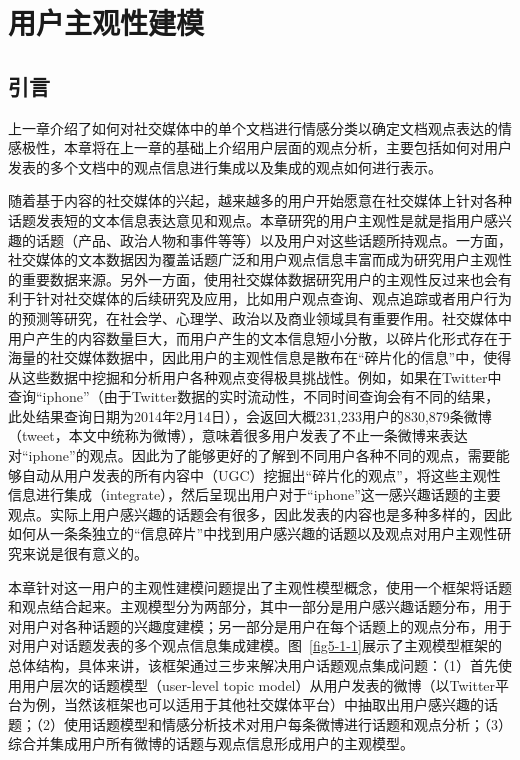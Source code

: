 \chapter{用户主观性建模}
\label{ch5}

\section{引言}
上一章介绍了如何对社交媒体中的单个文档进行情感分类以确定文档观点表达的情感极性，本章将在上一章的基础上介绍用户层面的观点分析，主要包括如何对用户发表的多个文档中的观点信息进行集成以及集成的观点如何进行表示。

随着基于内容的社交媒体的兴起，越来越多的用户开始愿意在社交媒体上针对各种话题发表短的文本信息表达意见和观点。本章研究的用户主观性是就是指用户感兴趣的话题（产品、政治人物和事件等等）以及用户对这些话题所持观点。一方面，社交媒体的文本数据因为覆盖话题广泛和用户观点信息丰富而成为研究用户主观性的重要数据来源。另外一方面，使用社交媒体数据研究用户的主观性反过来也会有利于针对社交媒体的后续研究及应用，比如用户观点查询、观点追踪或者用户行为的预测等研究，在社会学、心理学、政治以及商业领域具有重要作用。社交媒体中用户产生的内容数量巨大，而用户产生的文本信息短小分散，以碎片化形式存在于海量的社交媒体数据中，因此用户的主观性信息是散布在“碎片化的信息”中，使得从这些数据中挖掘和分析用户各种观点变得极具挑战性。例如，如果在Twitter中查询“iphone”（由于Twitter数据的实时流动性，不同时间查询会有不同的结果，此处结果查询日期为2014年2月14日），会返回大概231,233用户的830,879条微博（tweet，本文中统称为微博），意味着很多用户发表了不止一条微博来表达对“iphone”的观点。因此为了能够更好的了解到不同用户各种不同的观点，需要能够自动从用户发表的所有内容中（UGC）挖掘出“碎片化的观点”，将这些主观性信息进行集成（integrate），然后呈现出用户对于“iphone”这一感兴趣话题的主要观点。实际上用户感兴趣的话题会有很多，因此发表的内容也是多种多样的，因此如何从一条条独立的“信息碎片”中找到用户感兴趣的话题以及观点对用户主观性研究来说是很有意义的。

本章针对这一用户的主观性建模问题提出了主观性模型概念，使用一个框架将话题和观点结合起来。主观模型分为两部分，其中一部分是用户感兴趣话题分布，用于对用户对各种话题的兴趣度建模；另一部分是用户在每个话题上的观点分布，用于对用户对话题发表的多个观点信息集成建模。图~\ref{fig5-1-1}展示了主观模型框架的总体结构，具体来讲，该框架通过三步来解决用户话题观点集成问题：（1）首先使用用户层次的话题模型（user-level topic model）从用户发表的微博（以Twitter平台为例，当然该框架也可以适用于其他社交媒体平台）中抽取出用户感兴趣的话题；（2）使用话题模型和情感分析技术对用户每条微博进行话题和观点分析；（3）综合并集成用户所有微博的话题与观点信息形成用户的主观模型。


